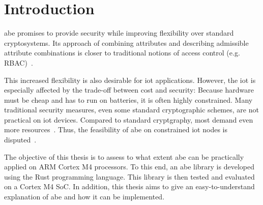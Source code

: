 
\chapter{Introduction}\label{chapter:introduction}





\acrfull{abe} promises to provide security while improving flexibility over standard cryptosystems.
Its approach of combining \glspl{attribute} and  describing admissible attribute combinations is closer to traditional notions of access control (e.g. RBAC)~\cite{bethencourt_ciphertext-policy_2007}. %

This increased flexibility is also desirable for \acrshort{iot} applications.
However, the \acrfull{iot} is especially affected by the trade-off between cost and security:
Because hardware must be cheap and has to run on batteries, it is often highly constrained.
Many traditional security measures, even some standard cryptographic schemes, are not practical on \acrshort{iot} devices.
Compared to standard cryptgraphy, most  demand even more resources~\cite{wang_performance_2014}.
Thus, the feasibility of \acrshort{abe} on constrained \acrshort{iot} nodes is disputed~\cite{wang_performance_2014,ambrosin_feasibility_2016,ambrosin_feasibility_2015,girgenti_feasibility_2019,borgh_attribute-based_2016}.

The objective of this thesis is to assess to what extent \acrshort{abe} can be practically applied on ARM Cortex M4 processors.
To this end, an \acrshort{abe} library is developed using the Rust programming language.
This library is then tested and evaluated on a Cortex M4 SoC.
In addition, this thesis aims to give an easy-to-understand explanation of \acrshort{abe} and how it can be implemented.


